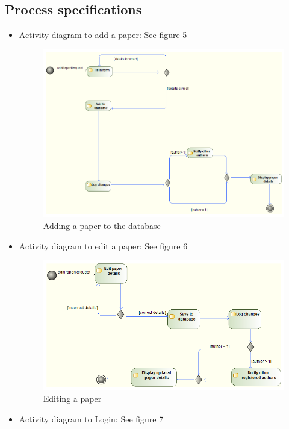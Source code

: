 \documentclass[english]{article}
\begin{document}
			\clearpage
		\subsection{Process specifications}
			\begin{itemize}
				\item Activity diagram to add a paper: See figure 5
					\begin{figure}[!h]
						\includegraphics[width=\linewidth]{Activity diagram-Add a paper.png}
						\caption{Adding a paper to the database}
					\end{figure}
				\item Activity diagram to edit a paper: See figure 6
					\begin{figure}[!h]
						\includegraphics[width=\linewidth]{Activity diagram_Edit a paper.png}
						\caption{Editing a paper}
					\end{figure}
				\item Activity diagram to Login: See figure 7
						\begin{figure}[!h]

\end{figure}
\end{itemize}
\end{document}
